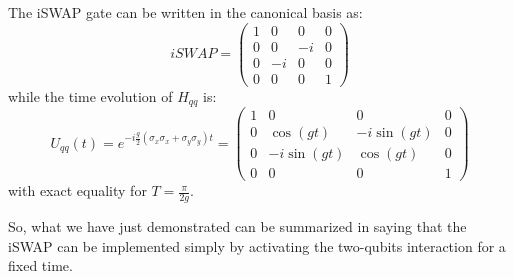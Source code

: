 The iSWAP gate can be written in the canonical basis as:
\begin{equation}
    iSWAP = 
    \begin{pmatrix}
        1 & 0 & 0 & 0 \\
        0 & 0 & -i & 0 \\
        0 & -i & 0 & 0 \\
        0 & 0 & 0 & 1
    \end{pmatrix}
\end{equation}
while the time evolution of $H_{qq}$ is:
\begin{equation}\label{eq:iswap_oscillations}
    U_{qq}(t) = e^{-i\frac{g}{2}(\sigma_x \sigma_x + \sigma_y \sigma_y)t}= 
    \begin{pmatrix}
        1 & 0 & 0 & 0 \\
        0 & \cos(gt) & -i\sin(gt) & 0 \\
        0 & -i\sin(gt) & \cos(gt) & 0 \\
        0 & 0 & 0 & 1
    \end{pmatrix}
\end{equation}
with exact equality for $T=\frac{\pi}{2g}$.

So, what we have just demonstrated can be summarized in saying that the iSWAP can be implemented simply by activating the two-qubits interaction for a fixed time.

